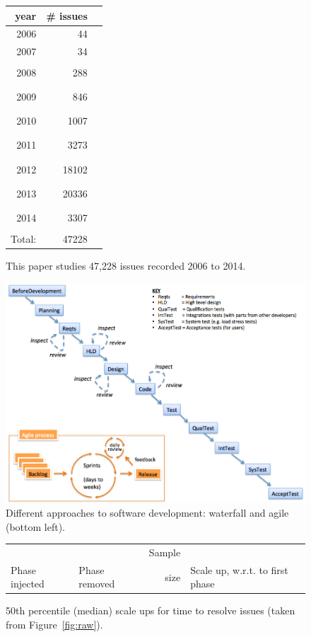 \documentclass{sig-alternate}
\newcommand{\fig}[1]{Figure~\ref{fig:#1}}
\def\baselinestretch{1}
\begin{document}
 
\begin{figure}
\begin{center}
\begin{tabular}{rrl}
year& \# issues&\\\hline
2006 &  44 &\\
2007 &  34 &\\
2008&  288 &\rule{1mm}{2mm}\\
2009&  846 &\rule{3mm}{2mm}\\
2010& 1007 &\rule{3mm}{2mm}\\
2011& 3273 &\rule{10mm}{2mm}\\
2012&18102 &\rule{45mm}{2mm}\\
2013&20336 &\rule{50mm}{2mm}\\
2014& 3307 & \rule{10mm}{2mm}\\\cline{1-2}
Total:&47228
\end{tabular}
\end{center}
\caption{This paper studies 47,228 issues recorded 2006 to 2014.}\label{fig:years}
\end{figure}
\begin{figure}[!t]
\begin{center}
\includegraphics[width=6in]{waterfall2.png}
\end{center}
\caption{Different approaches to software development:  waterfall and agile (bottom left).}
\end{figure}


\begin{figure}[!t]

\renewcommand{\baselinestretch}{0.7} 
\begin{center}
\begin{tabular}{ll|r|rl}
            &                  & Sample\\
Phase injected & Phase removed & size & \multicolumn{2}{l}{Scale up, w.r.t. to first phase}

\end{tabular}
\end{center}
\caption{50th percentile (median) scale ups  for  time to resolve issues (taken from \fig{raw}).}
\label{fig:scale}
\end{figure}
\end{document}
